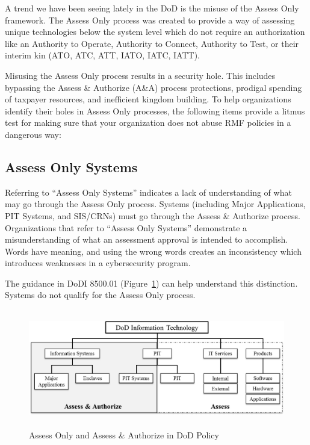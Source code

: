 A trend we have been seeing lately in the DoD is the misuse of the Assess Only framework. The Assess Only process was created to provide a way of assessing unique technologies below the system level which do not require an authorization like an Authority to Operate, Authority to Connect, Authority to Test, or their interim kin (ATO, ATC, ATT, IATO, IATC, IATT).\autocite[\pno~13]{20240212:dodi851001}

Misusing the Assess Only process results in a security hole. This includes bypassing the Assess \& Authorize (A\&A) process protections, prodigal spending of taxpayer resources, and inefficient kingdom building. To help organizations identify their holes in Assess Only processes, the following items provide a litmus test for making sure that your organization does not abuse RMF policies in a dangerous way:

\subsection{Assess Only Systems}
Referring to ``Assess Only Systems'' indicates a lack of understanding of what may go through the Assess Only process. Systems (including Major Applications, PIT Systems, and SIS/CRNs) must go through the Assess \& Authorize process. Organizations that refer to ``Assess Only Systems'' demonstrate a misunderstanding of what an assessment approval is intended to accomplish. Words have meaning, and using the wrong words creates an inconsistency which introduces weaknesses in a cybersecurity program.

The guidance in DoDI 8500.01 (Figure~\ref{fig:20240212:dodit}) can help understand this distinction.\autocite{20240212:dodi850001} Systems do not qualify for the Assess Only process.

\begin{figure}[h]
\centering
\includegraphics[width=14cm, height=5.144cm]{20240212.dodit.png}
\caption{Assess Only and Assess \& Authorize in DoD Policy}
\label{fig:20240212:dodit}
\end{figure}

